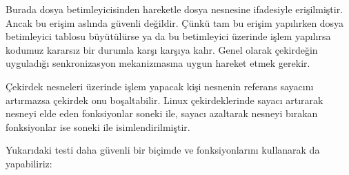 \documentclass[a4paper,10pt,turkish]{sphinxmanual}
\begin{document}
\sphinxAtStartPar
Burada dosya betimleyicisinden hareketle dosya nesnesine  ifadesiyle
erişilmiştir. Ancak bu erişim aslında güvenli değildir. Çünkü tam bu erişim yapılırken dosya
betimleyici tablosu büyütülürse ya da bu betimleyici üzerinde işlem yapılırsa kodumuz kararsız
bir durumla karşı karşıya kalır. Genel olarak çekirdeğin uyguladığı senkronizasyon mekanizmasına
uygun hareket etmek gerekir.

\sphinxAtStartPar
Çekirdek nesneleri üzerinde işlem yapacak kişi nesnenin referans sayacını artırmazsa çekirdek onu
boşaltabilir. Linux çekirdeklerinde sayacı artırarak nesneyi elde eden fonksiyonlar  soneki
ile, sayacı azaltarak nesneyi bırakan fonksiyonlar ise  soneki ile isimlendirilmiştir.

\sphinxAtStartPar
{}

\sphinxAtStartPar
Yukarıdaki testi daha güvenli bir biçimde  ve  fonksiyonlarını kullanarak da
yapabiliriz:

\begin{sphinxVerbatim}[commandchars=\\\{\}]




\end{sphinxVerbatim}
\end{document}
